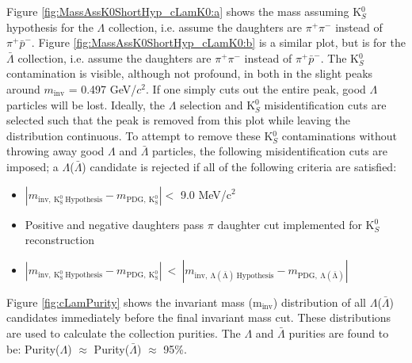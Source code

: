 \documentclass[../AnalysisNoteJBuxton.tex]{subfiles}
\begin{document}
Figure \ref{fig:MassAssK0ShortHyp_cLamK0:a} shows the mass assuming K$^{0}_{S}$ hypothesis for the $\Lambda$ collection, i.e. assume the daughters are $\pi^{+}\pi^{-}$ instead of $\pi^{+}\bar{p}^{-}$.
Figure \ref{fig:MassAssK0ShortHyp_cLamK0:b} is a similar plot, but is for the $\bar{\Lambda}$ collection, i.e. assume the daughters are $\pi^{+}\pi^{-}$ instead of $\pi^{+}\bar{p}^{-}$.
The K$^{0}_{S}$ contamination is visible, although not profound, in both in the slight peaks around $m_{\mathrm{inv}}$ = 0.497 GeV/$c^{2}$.
If one simply cuts out the entire peak, good $\Lambda$ particles will be lost.
Ideally, the $\Lambda$ selection and K$^{0}_{S}$ misidentification cuts are selected such that the peak is removed from this plot while leaving the distribution continuous.
To attempt to remove these K$^{0}_{S}$ contaminations without throwing away good $\Lambda$ and $\bar{\Lambda}$ particles, the following misidentification cuts are imposed; a $\Lambda$($\bar{\Lambda}$) candidate is rejected if all of the following criteria are satisfied:
\begin{itemize}
 \item $\left|m_{\mathrm{inv,~ K^{0}_{S}~ Hypothesis}} - m_{\mathrm{PDG,~ K^{0}_{S}}}\right| < $ 9.0 MeV/c$^{2}$
 \item Positive and negative daughters pass $\pi$ daughter cut implemented for K$^{0}_{S}$ reconstruction
 \item $\left|m_{\mathrm{inv,~ K^{0}_{S}~ Hypothesis}} - m_{\mathrm{PDG,~ K^{0}_{S}}}\right|~ < ~\left|m_{\mathrm{inv,~ \Lambda(\bar{\Lambda})~ Hypothesis}} - m_{\mathrm{PDG,~ \Lambda(\bar{\Lambda})}}\right|$
\end{itemize} 


Figure \ref{fig:cLamPurity} shows the invariant mass (m$_{\mathrm{inv}}$) distribution of all $\Lambda$($\bar{\Lambda}$) candidates immediately before the final invariant mass cut.
These distributions are used to calculate the collection purities.
The $\Lambda$ and $\bar{\Lambda}$ purities are found to be: Purity($\Lambda$) $\approx$ Purity($\bar{\Lambda}$) $\approx$ 95\%.
\end{document}
